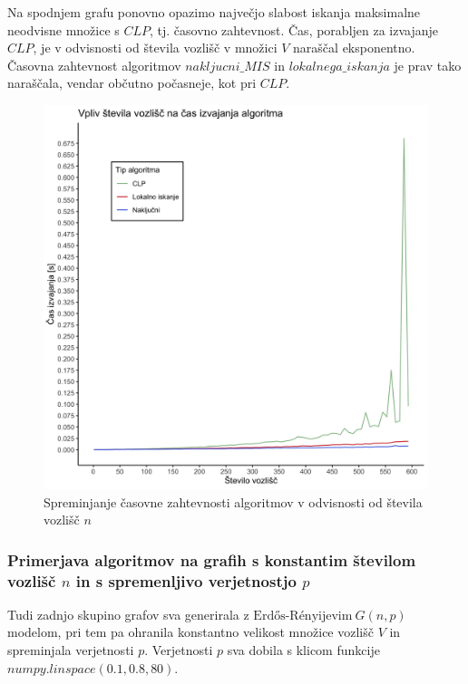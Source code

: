 \documentclass[a4paper, 12pt]{article}
\begin{document}
\noindent Na spodnjem grafu ponovno opazimo največjo slabost iskanja maksimalne neodvisne množice s $CLP$, tj. časovno zahtevnost. Čas, porabljen za izvajanje $CLP$, je v odvisnosti od števila vozlišč v množici $V$
naraščal eksponentno. Časovna zahtevnost algoritmov $nakljucni\_MIS$ in $lokalnega\_iskanja$ je prav tako naraščala, vendar občutno počasneje, kot pri $CLP$.



\begin{figure}[h!]
	\begin{center}
		\includegraphics[scale=0.11]{R_koda/voz-cas.png}
		\caption{Spreminjanje časovne zahtevnosti algoritmov v odvisnosti od števila vozlišč $n$}
	\end{center}
\end{figure}


\subsubsection{Primerjava algoritmov na grafih s konstantim številom vozlišč $n$ in s spremenljivo verjetnostjo $p$}

Tudi zadnjo skupino grafov sva generirala z $\text{Erdős-Rényijevim}\ G(n, p)$ modelom, pri tem pa ohranila konstantno velikost množice vozlišč $V$ in spreminjala verjetnosti $p$.
Verjetnosti $p$ sva dobila s klicom funkcije $numpy.linspace(0.1, 0.8, 80)$.\\
\end{document}
